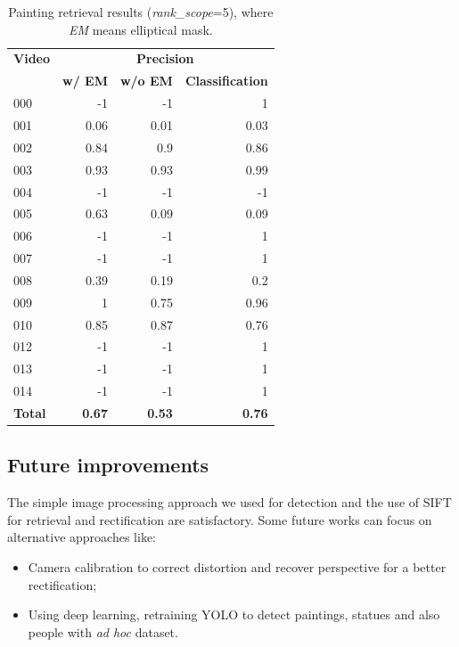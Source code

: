 \documentclass[10pt,twocolumn,letterpaper]{article}
\begin{document}
\begin{table}[]
\begin{center}
\begin{tabular}{lrrr}
\multicolumn{1}{c}{\textbf{Video}} & \multicolumn{3}{c}{\textbf{Precision}} \\
\multicolumn{1}{c}{} & \multicolumn{1}{c}{\textbf{w/ EM}} & \multicolumn{1}{c}{\textbf{w/o EM}} & \multicolumn{1}{c}{\textbf{Classification}} \\ \hline \hline
000 & -1 & -1 & 1 \\
001 & 0.06 & 0.01 & 0.03 \\
002 & 0.84 & 0.9 & 0.86 \\
003 & 0.93 & 0.93 & 0.99 \\
004 & -1 & -1 & -1 \\
005 & 0.63 & 0.09 & 0.09 \\
006 & -1 & -1 & 1 \\
007 & -1 & -1 & 1 \\
008 & 0.39 & 0.19 & 0.2 \\
009 & 1 & 0.75 & 0.96 \\
010 & 0.85 & 0.87 & 0.76 \\
012 & -1 & -1 & 1 \\
013 & -1 & -1 & 1 \\
014 & -1 & -1 & 1 \\ \hline \hline
\textbf{Total} & \textbf{0.67} & \textbf{0.53} & \textbf{0.76}
\end{tabular}
\end{center}
\caption{Painting retrieval results (\textit{rank\_scope}=5), where \textit{EM} means elliptical mask.}
\label{tab:PaintingRetrievalResults}
\end{table}

\subsection{Future improvements}
\label{subsec:FutureImprovements}
The simple image processing approach we used for detection and the use of SIFT for retrieval and rectification are satisfactory. Some future works can focus on alternative approaches like:
\begin{itemize}
    \item Camera calibration to correct distortion and recover perspective for a better rectification;
    \item Using deep learning, \eg retraining YOLO to detect paintings, statues and also people with \textit{ad hoc} dataset.
\end{itemize}

{\small


}
\end{document}
